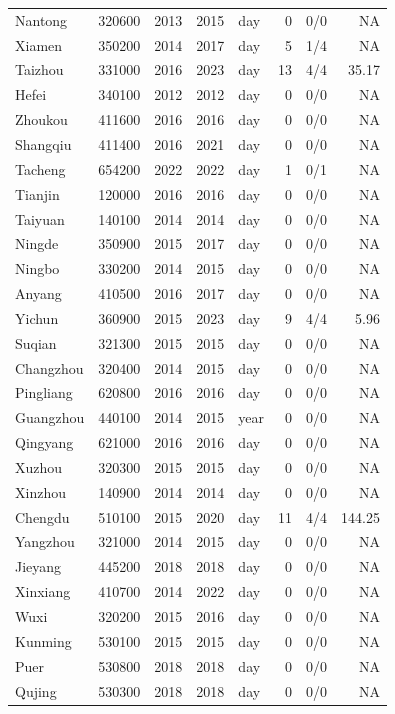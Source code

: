 \begin{longtable}{@{}llrrlrrr@{}}
Nantong & 320600 & 2013 & 2015 & day & 0 & 0/0 & NA \\
Xiamen & 350200 & 2014 & 2017 & day & 5 & 1/4 & NA \\
Taizhou & 331000 & 2016 & 2023 & day & 13 & 4/4 & 35.17 \\
Hefei & 340100 & 2012 & 2012 & day & 0 & 0/0 & NA \\
Zhoukou & 411600 & 2016 & 2016 & day & 0 & 0/0 & NA \\
Shangqiu & 411400 & 2016 & 2021 & day & 0 & 0/0 & NA \\
Tacheng & 654200 & 2022 & 2022 & day & 1 & 0/1 & NA \\
Tianjin & 120000 & 2016 & 2016 & day & 0 & 0/0 & NA \\
Taiyuan & 140100 & 2014 & 2014 & day & 0 & 0/0 & NA \\
Ningde & 350900 & 2015 & 2017 & day & 0 & 0/0 & NA \\
Ningbo & 330200 & 2014 & 2015 & day & 0 & 0/0 & NA \\
Anyang & 410500 & 2016 & 2017 & day & 0 & 0/0 & NA \\
Yichun & 360900 & 2015 & 2023 & day & 9 & 4/4 & 5.96 \\
Suqian & 321300 & 2015 & 2015 & day & 0 & 0/0 & NA \\
Changzhou & 320400 & 2014 & 2015 & day & 0 & 0/0 & NA \\
Pingliang & 620800 & 2016 & 2016 & day & 0 & 0/0 & NA \\
Guangzhou & 440100 & 2014 & 2015 & year & 0 & 0/0 & NA \\
Qingyang & 621000 & 2016 & 2016 & day & 0 & 0/0 & NA \\
Xuzhou & 320300 & 2015 & 2015 & day & 0 & 0/0 & NA \\
Xinzhou & 140900 & 2014 & 2014 & day & 0 & 0/0 & NA \\
Chengdu & 510100 & 2015 & 2020 & day & 11 & 4/4 & 144.25 \\
Yangzhou & 321000 & 2014 & 2015 & day & 0 & 0/0 & NA \\
Jieyang & 445200 & 2018 & 2018 & day & 0 & 0/0 & NA \\
Xinxiang & 410700 & 2014 & 2022 & day & 0 & 0/0 & NA \\
Wuxi & 320200 & 2015 & 2016 & day & 0 & 0/0 & NA \\
Kunming & 530100 & 2015 & 2015 & day & 0 & 0/0 & NA \\
Puer & 530800 & 2018 & 2018 & day & 0 & 0/0 & NA \\
Qujing & 530300 & 2018 & 2018 & day & 0 & 0/0 & NA \\

\end{longtable}
